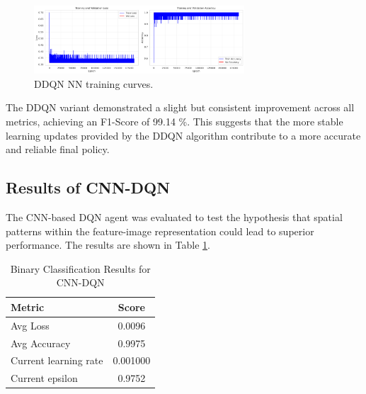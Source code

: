 \documentclass[16pt]{report}
\begin{document}
\vspace{0.5cm}

\begin{figure}[htbp]
    \centering
    \includegraphics[width=0.7\textwidth]{images/double_dqn_nn_training_curves.png}
    \caption{DDQN NN training curves.}
    \label{fig:ddqn_training_curves}
\end{figure}

The DDQN variant demonstrated a slight but consistent improvement across all metrics, achieving an F1-Score of 99.14 \%. This suggests that the more stable learning updates provided by the DDQN algorithm contribute to a more accurate and reliable final policy.

\newpage
\subsection{Results of CNN-DQN}
The CNN-based DQN agent was evaluated to test the hypothesis that spatial patterns within the feature-image representation could lead to superior performance. The results are shown in Table \ref{tab:binary_cnn_dqn_results}.

\begin{table}[H]
    \centering
    \caption{Binary Classification Results for CNN-DQN}
    \label{tab:binary_cnn_dqn_results}
    \begin{tabular}{@{}lc@{}}
        \toprule
        \textbf{Metric} & \textbf{Score} \\
        \midrule
        Avg Loss & 0.0096\\
        Avg Accuracy & 0.9975 \\
        Current learning rate & 0.001000 \\
        Current epsilon & 0.9752 \\
        \bottomrule
    \end{tabular}
\end{table}
\end{document}
